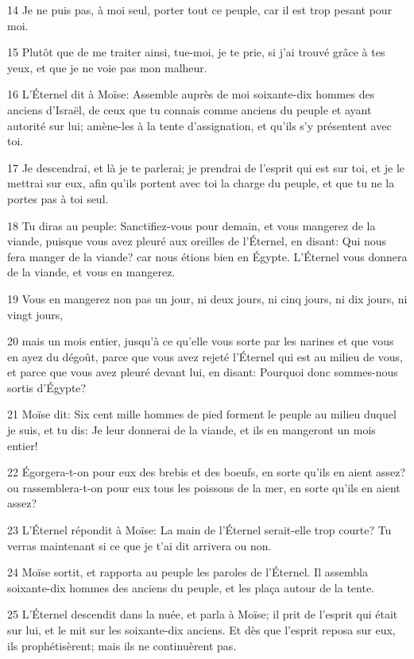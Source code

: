 \par 14 Je ne puis pas, à moi seul, porter tout ce peuple, car il est trop pesant pour moi.
\par 15 Plutôt que de me traiter ainsi, tue-moi, je te prie, si j'ai trouvé grâce à tes yeux, et que je ne voie pas mon malheur.
\par 16 L'Éternel dit à Moïse: Assemble auprès de moi soixante-dix hommes des anciens d'Israël, de ceux que tu connais comme anciens du peuple et ayant autorité sur lui; amène-les à la tente d'assignation, et qu'ils s'y présentent avec toi.
\par 17 Je descendrai, et là je te parlerai; je prendrai de l'esprit qui est sur toi, et je le mettrai sur eux, afin qu'ils portent avec toi la charge du peuple, et que tu ne la portes pas à toi seul.
\par 18 Tu diras au peuple: Sanctifiez-vous pour demain, et vous mangerez de la viande, puisque vous avez pleuré aux oreilles de l'Éternel, en disant: Qui nous fera manger de la viande? car nous étions bien en Égypte. L'Éternel vous donnera de la viande, et vous en mangerez.
\par 19 Vous en mangerez non pas un jour, ni deux jours, ni cinq jours, ni dix jours, ni vingt jours,
\par 20 mais un mois entier, jusqu'à ce qu'elle vous sorte par les narines et que vous en ayez du dégoût, parce que vous avez rejeté l'Éternel qui est au milieu de vous, et parce que vous avez pleuré devant lui, en disant: Pourquoi donc sommes-nous sortis d'Égypte?
\par 21 Moïse dit: Six cent mille hommes de pied forment le peuple au milieu duquel je suis, et tu dis: Je leur donnerai de la viande, et ils en mangeront un mois entier!
\par 22 Égorgera-t-on pour eux des brebis et des boeufs, en sorte qu'ils en aient assez? ou rassemblera-t-on pour eux tous les poissons de la mer, en sorte qu'ils en aient assez?
\par 23 L'Éternel répondit à Moïse: La main de l'Éternel serait-elle trop courte? Tu verras maintenant si ce que je t'ai dit arrivera ou non.
\par 24 Moïse sortit, et rapporta au peuple les paroles de l'Éternel. Il assembla soixante-dix hommes des anciens du peuple, et les plaça autour de la tente.
\par 25 L'Éternel descendit dans la nuée, et parla à Moïse; il prit de l'esprit qui était sur lui, et le mit sur les soixante-dix anciens. Et dès que l'esprit reposa sur eux, ils prophétisèrent; mais ils ne continuèrent pas.
